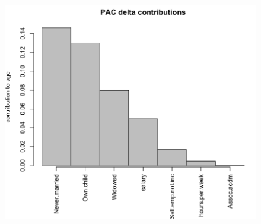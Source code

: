 \documentclass{beamer}
\begin{document}
\begin{frame}

\begin{figure}
\includegraphics[scale=0.3]{figures/ageContrib.png}
\caption{}
 \label{fig:ageContrib}
\end{figure}

\end{frame}

\author[Christopher Patton]{C. Patton, A. Rumbaugh, T. Provan, O. Prilepova, J. Chen}

\begin{frame}
\frametitle{}
\end{frame}

\begin{frame}
\frametitle{}
\end{frame}

\begin{frame}
\frametitle{}
\end{frame}

\begin{frame}
\frametitle{}
\end{frame}

\begin{frame}
\frametitle{}
\end{frame}
\end{document}
